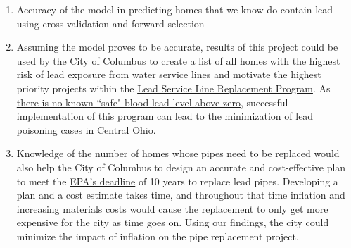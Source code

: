 \documentclass{article}
\begin{document}
\begin{enumerate}
    \item Accuracy of the model in predicting homes that we know do contain lead using cross-validation and forward selection
    
    \item Assuming the model proves to be accurate, results of this project could be used by the City of Columbus to create a list of all homes with the highest risk of lead exposure from water service lines and motivate the highest priority projects within the \href{https://www.columbus.gov/Services/Columbus-Water-Power/About-Columbus-Water-Power/The-Division-of-Water/Water-Facts/Water-Health/Lead-Service-Program-Information}{Lead Service Line Replacement Program}. As \href{https://www.epa.gov/ground-water-and-drinking-water/basic-information-about-lead-drinking-water#:~:text=EPA%20and%20the%20Centers%20for,to%20health%2C%20especially%20for%20children.&text=Can%20I%20shower%20in%20lead%2Dcontaminated%20water%3F}{there is no known ``safe" blood lead level above zero}, successful implementation of this program can lead to the minimization of lead poisoning cases in Central Ohio.  
    
    \item Knowledge of the number of homes whose pipes need to be replaced would also help the City of Columbus to design an accurate and cost-effective plan to meet the \href{https://www.epa.gov/newsreleases/biden-harris-administration-issues-final-rule-requiring-replacement-lead-pipes-within}{EPA's deadline} of 10 years to replace lead pipes. Developing a plan and a cost estimate takes time, and throughout that time inflation and increasing materials costs would cause the replacement to only get more expensive for the city as time goes on. Using our findings, the city could minimize the impact of inflation on the pipe replacement project. 

\end{enumerate}
\end{document}

